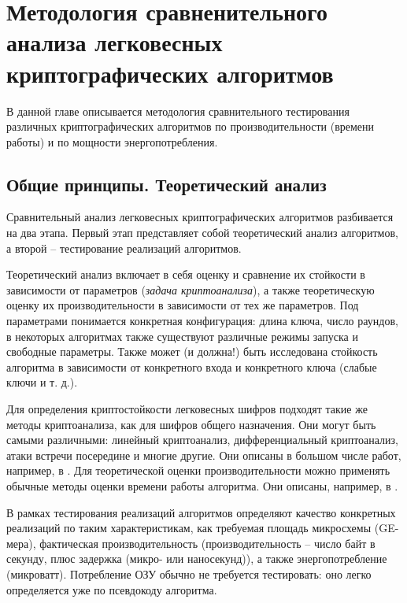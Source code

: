 \chapter{Методология сравненительного анализа легковесных криптографических алгоритмов} \label{ch3}

В данной главе описывается методология сравнительного тестирования различных криптографических алгоритмов по производительности (времени работы) и по мощности энергопотребления.
	
\section{Общие принципы. Теоретический анализ} \label{ch3:sec1}

Сравнительный анализ легковесных криптографических алгоритмов разбивается на два этапа. Первый этап представляет собой теоретический анализ алгоритмов, а второй – тестирование реализаций алгоритмов.

Теоретический анализ включает в себя оценку и сравнение их стойкости в зависимости от параметров (\textit{задача криптоанализа}), а также теоретическую оценку их производительности в зависимости от тех же параметров. Под параметрами понимается конкретная конфигурация: длина ключа, число раундов, в некоторых алгоритмах также существуют различные режимы запуска и свободные параметры. Также может (и должна!) быть исследована стойкость алгоритма в зависимости от конкретного входа и конкретного ключа (слабые ключи и т. д.). 

Для определения криптостойкости легковесных шифров подходят такие же методы криптоанализа, как для шифров общего назначения. Они могут быть самыми различными: линейный криптоанализ, дифференциальный криптоанализ, атаки встречи посередине и многие другие. Они описаны в большом числе работ, например, в \cite{src53}\cite{src54}\cite{src55}\cite{src56}. Для теоретической оценки производительности можно применять обычные методы оценки времени работы алгоритма. Они описаны, например, в \cite{src57}.

В рамках тестирования реализаций алгоритмов определяют качество конкретных реализаций по таким характеристикам, как требуемая площадь микросхемы (GE-мера), фактическая производительность (производительность – число байт в секунду, плюс задержка (микро- или наносекунд)), а также энергопотребление (микроватт). Потребление ОЗУ обычно не требуется тестировать: оно легко определяется уже по псевдокоду алгоритма.

